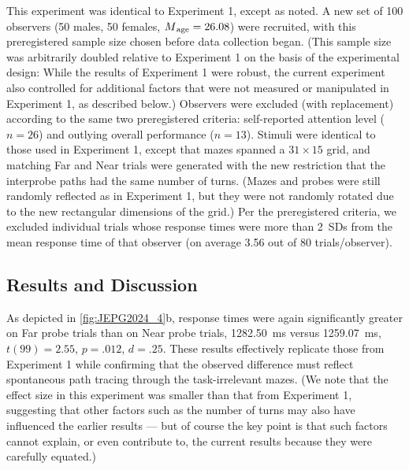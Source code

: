 This experiment was identical to Experiment 1, except as noted. A new set of 100 observers (50 males, 50 females, $M\textsubscript{age} =  26.08$) were recruited, with this preregistered sample size chosen before data collection began. (This sample size was arbitrarily doubled relative to Experiment 1 on the basis of the experimental design: While the results of Experiment 1 were robust, the current experiment also controlled for additional factors that were not measured or manipulated in Experiment 1, as described below.) Observers were excluded (with replacement) according to the same two preregistered criteria: self-reported attention level ($n = 26$) and outlying overall performance ($n = 13$). Stimuli were identical to those used in Experiment 1, except that mazes spanned a $31 \times 15$ grid, and matching Far and Near trials were generated with the new restriction that the interprobe paths had the same number of turns. (Mazes and probes were still randomly reflected as in Experiment 1, but they were not randomly rotated due to the new rectangular dimensions of the grid.) Per the preregistered criteria, we excluded individual trials whose response times were more than \qty{2}{SD}s from the mean response time of that observer (on average 3.56 out of 80 trials/observer).

\subsection{Results and Discussion}

As depicted in \cref{fig:JEPG2024_4}b, response times were again significantly greater on Far probe trials than on Near probe trials, \qty{1282.50}{\milli\second} versus \qty{1259.07}{\milli\second}, $t(99) = 2.55$, $p = .012$, $d = .25$. These results effectively replicate those from Experiment 1 while confirming that the observed difference must reflect spontaneous path tracing through the task-irrelevant mazes. (We note that the effect size in this experiment was smaller than that from Experiment 1, suggesting that other factors such as the number of turns may also have influenced the earlier results --- but of course the key point is that such factors cannot explain, or even contribute to, the current results because they were carefully equated.)

